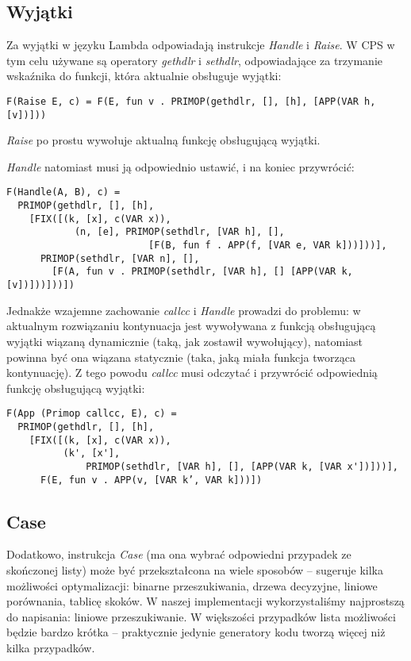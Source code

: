 \documentclass[11pt]{scrartcl}
\begin{document}
\subsection{Wyjątki}
Za wyjątki w języku  Lambda odpowiadają instrukcje \textit{Handle} i \textit{Raise}. W CPS w tym
celu używane są operatory \textit{gethdlr} i \textit{sethdlr}, odpowiadające za trzymanie
wskaźnika do funkcji, która aktualnie obsługuje wyjątki:
\begin{lstlisting}
F(Raise E, c) = F(E, fun v . PRIMOP(gethdlr, [], [h], [APP(VAR h, [v])]))
\end{lstlisting}
\textit{Raise} po prostu wywołuje aktualną funkcję obsługującą wyjątki.

\textit{Handle} natomiast musi ją odpowiednio ustawić, i na koniec przywrócić:
\begin{lstlisting}
F(Handle(A, B), c) =
  PRIMOP(gethdlr, [], [h],
    [FIX([(k, [x], c(VAR x)),
            (n, [e], PRIMOP(sethdlr, [VAR h], [],
                         [F(B, fun f . APP(f, [VAR e, VAR k]))]))],
      PRIMOP(sethdlr, [VAR n], [],
        [F(A, fun v . PRIMOP(sethdlr, [VAR h], [] [APP(VAR k, [v])]))]))])
\end{lstlisting}

Jednakże wzajemne zachowanie \textit{callcc} i \textit{Handle} prowadzi do problemu: w aktualnym rozwiązaniu
kontynuacja jest wywoływana z funkcją obsługującą wyjątki wiązaną dynamicznie
(taką, jak zostawił wywołujący), natomiast powinna być ona wiązana statycznie
(taka, jaką miała funkcja tworząca kontynuację). Z tego powodu \textit{callcc} musi
odczytać i przywrócić odpowiednią funkcję obsługującą wyjątki:
\begin{lstlisting}
F(App (Primop callcc, E), c) =
  PRIMOP(gethdlr, [], [h],
    [FIX([(k, [x], c(VAR x)),
          (k', [x'], 
              PRIMOP(sethdlr, [VAR h], [], [APP(VAR k, [VAR x'])]))],
      F(E, fun v . APP(v, [VAR k’, VAR k]))])
\end{lstlisting}

\subsection{Case}
Dodatkowo, instrukcja \textit{Case} (ma ona
wybrać odpowiedni przypadek ze skończonej listy) może być przekształcona na
wiele sposobów  -- \cite[Chapter 5.7: Case statements]{Appel} sugeruje kilka
możliwości optymalizacji: binarne przeszukiwania, drzewa decyzyjne, liniowe
porównania, tablicę skoków. W naszej implementacji wykorzystaliśmy najprostszą
do napisania: liniowe przeszukiwanie. W większości przypadków lista możliwości
będzie bardzo krótka -- praktycznie jedynie generatory kodu tworzą więcej niż
kilka przypadków.
\end{document}
